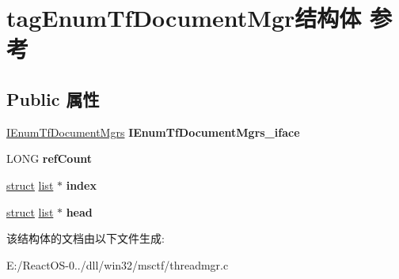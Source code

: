 \hypertarget{structtag_enum_tf_document_mgr}{}\section{tag\+Enum\+Tf\+Document\+Mgr结构体 参考}
\label{structtag_enum_tf_document_mgr}
\subsection*{Public 属性}
\begin{DoxyCompactItemize}
\item 
\mbox{\label{structtag_enum_tf_document_mgr_a4fd47966e4efa8ec67f53c1f4ee63f41}} 
\hyperlink{interface_i_enum_tf_document_mgrs}{I\+Enum\+Tf\+Document\+Mgrs} {\bfseries I\+Enum\+Tf\+Document\+Mgrs\+\_\+iface}
\item 
\mbox{\label{structtag_enum_tf_document_mgr_a62ceed1bc36af621c11c53f00601cebf}} 
L\+O\+NG {\bfseries ref\+Count}
\item 
\mbox{\label{structtag_enum_tf_document_mgr_aade55f211436d746ddedb1273e8280ed}} 
\hyperlink{interfacestruct}{struct} \hyperlink{classlist}{list} $\ast$ {\bfseries index}
\item 
\mbox{\label{structtag_enum_tf_document_mgr_a497292793b799dc346ea2459780c2ff2}} 
\hyperlink{interfacestruct}{struct} \hyperlink{classlist}{list} $\ast$ {\bfseries head}
\end{DoxyCompactItemize}


该结构体的文档由以下文件生成\+:\begin{DoxyCompactItemize}
\item 
E\+:/\+React\+O\+S-\/0../dll/win32/msctf/threadmgr.\+c\end{DoxyCompactItemize}
